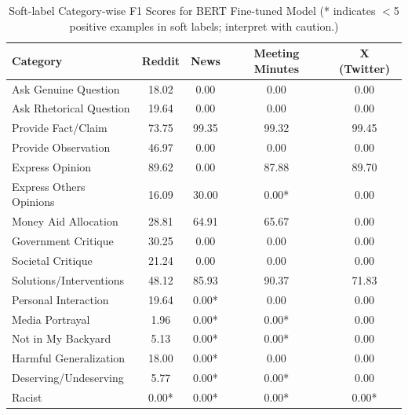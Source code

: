 \begin{table}[htbp]
\centering
\begin{tabular}{l *{4}{c}}
\toprule
Category & Reddit & News & Meeting Minutes & X (Twitter) \\
\midrule
Ask Genuine Question & 18.02 & 0.00 & 0.00 & 0.00 \\
Ask Rhetorical Question & 19.64 & 0.00 & 0.00 & 0.00 \\
Provide Fact/Claim & 73.75 & 99.35 & 99.32 & 99.45 \\
Provide Observation & 46.97 & 0.00 & 0.00 & 0.00 \\
Express Opinion & 89.62 & 0.00 & 87.88 & 89.70 \\
Express Others Opinions & 16.09 & 30.00 & 0.00* & 0.00 \\
Money Aid Allocation & 28.81 & 64.91 & 65.67 & 0.00 \\
Government Critique & 30.25 & 0.00 & 0.00 & 0.00 \\
Societal Critique & 21.24 & 0.00 & 0.00 & 0.00 \\
Solutions/Interventions & 48.12 & 85.93 & 90.37 & 71.83 \\
Personal Interaction & 19.64 & 0.00* & 0.00 & 0.00 \\
Media Portrayal & 1.96 & 0.00* & 0.00* & 0.00 \\
Not in My Backyard & 5.13 & 0.00* & 0.00* & 0.00 \\
Harmful Generalization & 18.00 & 0.00* & 0.00 & 0.00 \\
Deserving/Undeserving & 5.77 & 0.00* & 0.00* & 0.00 \\
Racist & 0.00* & 0.00* & 0.00* & 0.00* \\
\bottomrule
\end{tabular}
\centering\caption{Soft-label Category-wise F1 Scores for BERT Fine-tuned Model (* indicates $<$5 positive examples in soft labels; interpret with caution.)}
\label{tab:bert_category_breakdown}
\end{table}